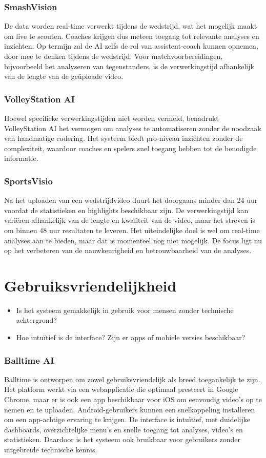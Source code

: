 \subsubsection{SmashVision}
De data worden real-time verwerkt tijdens de wedstrijd, wat het mogelijk maakt om live te scouten. Coaches krijgen dus meteen toegang tot relevante analyses en inzichten. Op termijn zal de AI zelfs de rol van assistent-coach kunnen opnemen, door mee te denken tijdens de wedstrijd. Voor matchvoorbereidingen, bijvoorbeeld het analyseren van tegenstanders, is de verwerkingstijd afhankelijk van de lengte van de geüploade video.
\subsubsection{VolleyStation AI}
Hoewel specifieke verwerkingstijden niet worden vermeld, benadrukt VolleyStation AI het vermogen om analyses te automatiseren zonder de noodzaak van handmatige codering. Het systeem biedt pro-niveau inzichten zonder de complexiteit, waardoor coaches en spelers snel toegang hebben tot de benodigde informatie. 
\subsubsection{SportsVisio}
Na het uploaden van een wedstrijdvideo duurt het doorgaans minder dan 24 uur voordat de statistieken en highlights beschikbaar zijn. De verwerkingstijd kan variëren afhankelijk van de lengte en kwaliteit van de video, maar het streven is om binnen 48 uur resultaten te leveren. Het uiteindelijke doel is wel om real-time analyses aan te bieden, maar dat is momenteel nog niet mogelijk. De focus ligt nu op het verbeteren van de nauwkeurigheid en betrouwbaarheid van de analyses.

\section{Gebruiksvriendelijkheid}
\begin{itemize}
  \item Is het systeem gemakkelijk in gebruik voor mensen zonder technische achtergrond?
  \item Hoe intuïtief is de interface? Zijn er apps of mobiele versies beschikbaar?
\end{itemize}
\subsubsection{Balltime AI}
Balltime is ontworpen om zowel gebruiksvriendelijk als breed toegankelijk te zijn. Het platform werkt via een webapplicatie die optimaal presteert in Google Chrome, maar er is ook een app beschikbaar voor iOS om eenvoudig video's op te nemen en te uploaden. Android-gebruikers kunnen een snelkoppeling installeren om een app-achtige ervaring te krijgen. De interface is intuïtief, met duidelijke dashboards, overzichtelijke menu’s en snelle toegang tot analyses, video’s en statistieken. Daardoor is het systeem ook bruikbaar voor gebruikers zonder uitgebreide technische kennis.
